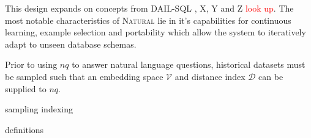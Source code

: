This design expands on concepts from DAIL-SQL \citep{DAIL}, X, Y and Z \textcolor{red}{look up}.
The most notable characteristics of \textsc{Natural} lie in it's capabilities for continuous
learning, example selection and portability which allow the system to iteratively
adapt to unseen database schemas.

Prior to using $nq$ to answer natural language questions, historical datasets must be sampled
such that an embedding space $\mathcal{V}$ and distance index $\mathcal{D}$ can be supplied
to $nq$.

{sampling}
{indexing}

{definitions}

